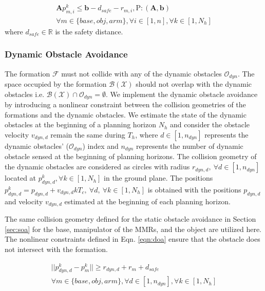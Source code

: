 \begin{equation}
	\begin{aligned}
		\mathbf{A}p^k_{m,i}\leq \boldsymbol{b} - d_{safe} - r_{m,i}, \mathrm{P}:(\mathbf{A},\boldsymbol{b})\\
		\forall m \in \{base,obj,arm\}, \forall i \in [1,n], \forall k \in [1,N_h]
	\end{aligned}
	\label{eqn:soar}
\end{equation}
 where $d_{safe}\in \mathbb{R}$ is the safety distance.
\subsubsection{Dynamic Obstacle Avoidance} \label{sec:doa}
The formation $\mathcal{F}$ must not collide with any of the dynamic obstacles $\mathcal{O}_{dyn}$. The space occupied by the formation $\mathcal{B}(\mathcal{X})$ should not overlap with the dynamic obstacles i.e. $\mathcal{B}(\mathcal{X}) \cap \mathcal{O}_{dyn} = \emptyset$. We implement the dynamic obstacle avoidance by introducing a nonlinear constraint between the collision geometries of the formations and the dynamic obstacles. We estimate the state of the dynamic obstacles at the beginning of a planning horizon $N_h$ and consider the obstacle velocity $v_{dyn,d}$ remain the same during $T_h$, where $d \in [1,n_{dyn}]$ represents the dynamic obstacles' ($\mathcal{O}_{dyn}$) index and $n_{dyn}$ represents the number of dynamic obstacle sensed at the beginning of planning horizons. The collision geometry of the dynamic obstacles are considered as circles with radius $r_{dyn,d},\ \forall d\in [1,n_{dyn}]$ located at $p^k_{dyn,d}, \forall k \in [1, N_h]$ in the ground plane. The positions $p^k_{dyn,d} = p_{dyn,d}+v_{dyn,d}kT_c,\ \forall d,\ \forall k \in [1,N_h]$ is obtained with the positions $p_{dyn,d}$ and velocity $v_{dyn,d}$ estimated at the beginning of each planning horizon.
 
The same collision geometry defined for the static obstacle avoidance in Section \ref{sec:soa} for the base, manipulator of the MMRs, and the object are utilized here. The nonlinear constraints defined in Eqn. \eqref{eqn:doa} ensure that the obstacle does not intersect with the formation.

\begin{equation}
    \begin{aligned}
        ||p^k_{dyn,d}-p^k_{m}|| \geq r_{dyn,d} + r_m + d_{safe}\\
        \forall m \in \{base,obj,arm\}, \forall d \in [1,n_{dyn}], \forall k \in [1,N_h]
    \end{aligned}
    \label{eqn:doa}
\end{equation}

